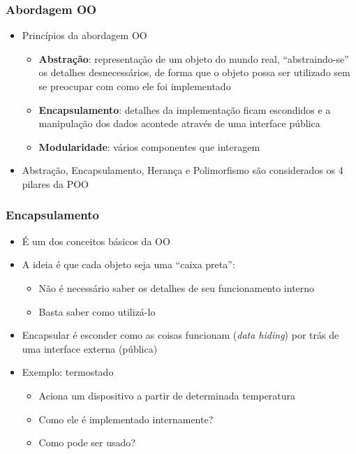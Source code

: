 \documentclass[aspectratio=169]{beamer}
\begin{document}
\begin{frame}\frametitle{Abordagem OO}
\begin{itemize}
	\item Princípios da abordagem OO
	\begin{itemize}
		\item \textbf{Abstração}: representação de um objeto do mundo real, ``abstraindo-se'' os detalhes desnecessários, de forma que o objeto possa ser utilizado sem se preocupar com como ele foi implementado
		\item \textbf{Encapsulamento}: detalhes da implementação ficam escondidos e a manipulação dos dados acontede através de uma interface pública
		\item \textbf{Modularidade}: vários componentes que interagem
	\end{itemize}
	\item Abstração, Encapsulamento, Herança e Polimorfismo são considerados os 4 pilares da POO
\end{itemize}
\end{frame}

\begin{frame}\frametitle{Encapsulamento}
\begin{itemize}
	\item É um dos conceitos básicos da OO
	\item A ideia é que cada objeto seja uma ``caixa preta'':
	\begin{itemize}
		\item Não é necessário saber os detalhes de seu funcionamento interno
		\item Basta saber como utilizá-lo
	\end{itemize}
	\item Encapsular é esconder como as coisas funcionam (\emph{data hiding}) por trás de uma interface externa (pública)
	\item Exemplo: termostado
	\begin{itemize}
		\item Aciona um dispositivo a partir de determinada temperatura
		\item Como ele é implementado internamente?
		\item Como pode ser usado?
	\end{itemize}
\end{itemize}
\end{frame}
\end{document}
